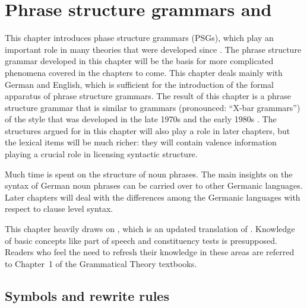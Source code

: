 \chapter{Phrase structure grammars and \xbart}
\label{chap-psg-xbar}\label{chap-psg}

This chapter introduces phase structure grammars (PSGs), which play an important role in many
theories that were developed since . The phrase structure grammar developed in
this chapter will be the basis for more complicated phenomena covered in the chapters to come. This
chapter deals mainly with German and English, which is sufficient for the introduction of the formal apparatus
of phrase structure grammars. The result of this chapter is a phrase structure grammar that is
similar to \xbar grammars (pronounced: ``X-bar grammars'') of the style that was developed in the late 1970s and the early 1980s
\citep{Chomsky70a,Jackendoff77a}. The structures argued for in this chapter will also play a role in later
chapters, but the lexical items will be much richer: they will contain valence information playing a
crucial role in licensing syntactic structure.

Much time is spent on the structure of noun phrases. The main insights on the syntax of German noun
phrases can be carried over to other Germanic languages. Later chapters will deal with the
differences among the Germanic languages with respect to clause level syntax.

This chapter heavily draws on , which is an updated translation of
. Knowledge of basic concepts like part of speech and
constituency tests is presupposed. Readers who feel the need to refresh their knowledge in these
areas are referred to Chapter~1 of the Grammatical Theory textbooks.

\section{Symbols and rewrite rules}
\label{sec-simple-psg}

